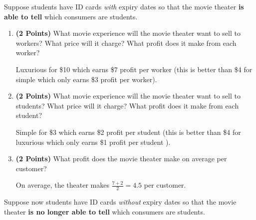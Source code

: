 \documentclass[11pt]{article}
\newcounter{question}[section]
\newenvironment{subquestions}{
  \begin{enumerate}[label=(\roman*)]}{\end{enumerate}}
\begin{document}
Suppose students have ID cards \emph{with} expiry dates so that the movie theater \textbf{is able to tell} which consumers are students.
\begin{subquestions}
  \item \textbf{(2 Points)} What movie experience will the movie theater want to sell to workers? What price will it charge? What profit does it make from each worker?

    \textcolor{solution-color}{
      Luxurious for \$10 which earns \$7 profit per worker (this is better than \$4 for simple which only earns \$3 profit per worker).
    }
  \item \textbf{(2 Points)} What movie experience will the movie theater want to sell to students? What price will it charge? What profit does it make from each student?

    \textcolor{solution-color}{
     Simple for \$3 which earns \$2 profit per student (this is better than \$4 for luxurious which only earns \$1 profit per student ).
    }
  \item \textbf{(2 Points)} What profit does the movie theater make on average per customer?

    \textcolor{solution-color}{
      On average, the theater makes $\frac{7+2}{2}=4.5$ per customer.
    }

\end{subquestions}
Suppose now students have ID cards \emph{without} expiry dates so that the movie theater \textbf{is no longer able to tell} which consumers are students.
\end{document}
